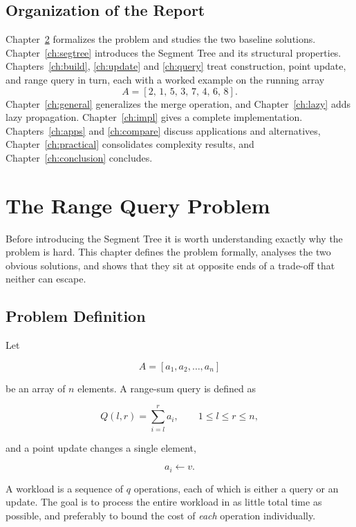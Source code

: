 \section{Organization of the Report}
Chapter~\ref{ch:problem} formalizes the problem and studies the two baseline solutions. Chapter~\ref{ch:segtree} introduces the Segment Tree and its structural properties. Chapters~\ref{ch:build}, \ref{ch:update} and \ref{ch:query} treat construction, point update, and range query in turn, each with a worked example on the running array
\[
A = [2,\,1,\,5,\,3,\,7,\,4,\,6,\,8].
\]
Chapter~\ref{ch:general} generalizes the merge operation, and Chapter~\ref{ch:lazy} adds lazy propagation. Chapter~\ref{ch:impl} gives a complete implementation. Chapters~\ref{ch:apps} and \ref{ch:compare} discuss applications and alternatives, Chapter~\ref{ch:practical} consolidates complexity results, and Chapter~\ref{ch:conclusion} concludes.

\chapter{The Range Query Problem}
\label{ch:problem}

Before introducing the Segment Tree it is worth understanding exactly why the problem is hard. This chapter defines the problem formally, analyses the two obvious solutions, and shows that they sit at opposite ends of a trade-off that neither can escape.

\section{Problem Definition}
Let

\begin{equation}
A = [a_1, a_2, \ldots, a_n]
\end{equation}

be an array of $n$ elements. A range-sum query is defined as

\begin{equation}
Q(l,r) = \sum_{i=l}^{r} a_i, \qquad 1 \le l \le r \le n,
\end{equation}

and a point update changes a single element,

\begin{equation}
a_i \leftarrow v.
\end{equation}

A workload is a sequence of $q$ operations, each of which is either a query or an update. The goal is to process the entire workload in as little total time as possible, and preferably to bound the cost of \emph{each} operation individually.

